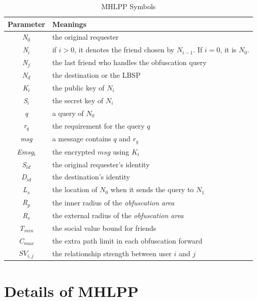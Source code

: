 \begin{table}
\caption{MHLPP Symbols}
\label{table:MhlppSymbols}
\centering
\begin{tabular}{|c|l|} \hline 
Parameter & Meanings \\ \hline 
\textit{N${}_{0}$} & the original requester \\ \hline 
\textit{N${}_{i}$} & if $i>0$, it denotes the friend chosen by ${N}_{i-1}$. \newline If $i=0$, it is ${N}_{0}$. \\ \hline 
\textit{N${}_{f}$} & the last friend who handles the obfuscation query \\ \hline 
\textit{N${}_{d}$} & the destination or the LBSP \\ \hline 
\textit{K${}_{i}$} & the public key of $N_i$ \\ \hline 
\textit{S${}_{i}$} & the secret key of $N_i$  \\ \hline 
\textit{q} & a query of $N_0$ \\ \hline 
\textit{r${}_{q}$} & the requirement for the query $q$ \\ \hline 
\textit{msg} & a message contains $q$ and ${r}_{q}$ \\ \hline 
\textit{Emsg${}_{i}$} & the encrypted $msg$ using ${K}_{i}$ \\ \hline 
\textit{S${}_{id}$} & the original requester's identity \\ \hline 
\textit{D${}_{id}$} & the destination's identity \\ \hline 
\textit{L${}_{s}$} & the location of ${N}_{0}$ when it sends the query to ${N}_{1}$ \\ \hline 
\textit{R${}_{p}$} & the inner radius of the \textit{obfuscation area} \\ \hline 
\textit{R${}_{s}$} & the external radius of the \textit{obfuscation area}  \\ \hline 
\textit{T${}_{min}$} & the social value bound for friends \\ \hline 
\textit{C${}_{max}$} & the extra path limit in each obfuscation forward \\ \hline 
\textit{${SV}_{i,j}$} & the relationship strength between user $i$ and $j$ \\ \hline 
\end{tabular}
\end{table}


\section{ Details of MHLPP}

